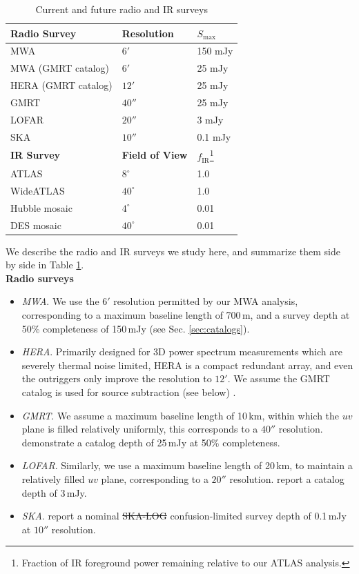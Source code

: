 \documentclass[numberedappendix]{emulateapj}
\newcommand{\ir}{\text{IR}}
\providecommand{\DIFadd}[1]{{\protect\color{blue}\uwave{#1}}} %
\providecommand{\DIFdel}[1]{{\protect\color{red}\sout{#1}}}                      %
\providecommand{\DIFaddbegin}{} %
\providecommand{\DIFaddend}{} %
\providecommand{\DIFdelbegin}{} %
\providecommand{\DIFdelend}{} %
\begin{document}
\DIFaddend \begin{table}
\caption{Current and future radio and IR surveys\label{tab:expts}}
\begin{tabular}{|l | l | l|}
\hline
\textbf{Radio Survey} & \textbf{Resolution} & \textbf{$S_\text{max}$} \\
\hline
MWA & $6'$ & 150 mJy \\
MWA (GMRT catalog) & $6'$ & 25 mJy \\
HERA (GMRT catalog) & $12'$ & 25 mJy \\
GMRT & $40''$ & 25 mJy \\
LOFAR & $20''$ & 3 mJy \\
SKA & $10''$ & 0.1 mJy \\
\hline\hline
\textbf{IR Survey} & \textbf{Field of View} & \textbf{$f_\ir$}\footnote{Fraction of IR foreground power remaining relative to our ATLAS analysis.} \\
\hline
ATLAS & $8^\circ$ & 1.0 \\
WideATLAS & $40^\circ$ & 1.0 \\
Hubble mosaic & $4^\circ$ & 0.01 \\
DES mosaic & $40^\circ$ & 0.01 \\
\hline
\end{tabular}
\end{table}


We describe the radio and IR surveys we study here, and summarize them side by side in Table \ref{tab:expts}. \\

\noindent\textbf{Radio surveys}
\begin{itemize}
\item \textit{MWA}. We use the $6'$ resolution permitted by our MWA analysis, corresponding to a maximum baseline length of 700\,m, and a survey depth at 50\% completeness of 150\,mJy (see Sec. \ref{sec:catalogs}).
\item \textit{HERA}. Primarily designed for 3D power spectrum measurements which are severely thermal noise limited, HERA is a compact redundant array, and even the outriggers only improve the resolution to $12'$. We assume the GMRT catalog is used for source subtraction (see below) \citet{deboer16}.
\item \textit{GMRT}. We assume a maximum baseline length of 10\,km, within which the $uv$ plane is filled relatively uniformly, this corresponds to a $40''$ resolution. \citet{intema17} demonstrate a catalog depth of 25\,mJy at 50\% completeness.
\item \textit{LOFAR}. Similarly, we use a maximum baseline length of 20\,km, to maintain a relatively filled $uv$ plane, corresponding to a $20''$ resolution. \citet{lofareorpaper} report a catalog depth of 3\,mJy. 
\item \textit{SKA}. \citet{prandoni15} report a nominal \DIFdelbegin \DIFdel{SKA-LOG }\DIFdelend \DIFaddbegin \DIFadd{SKA-Low }\DIFaddend confusion-limited survey depth of 0.1\,mJy at $10''$ resolution.
\end{itemize}
\end{document}
